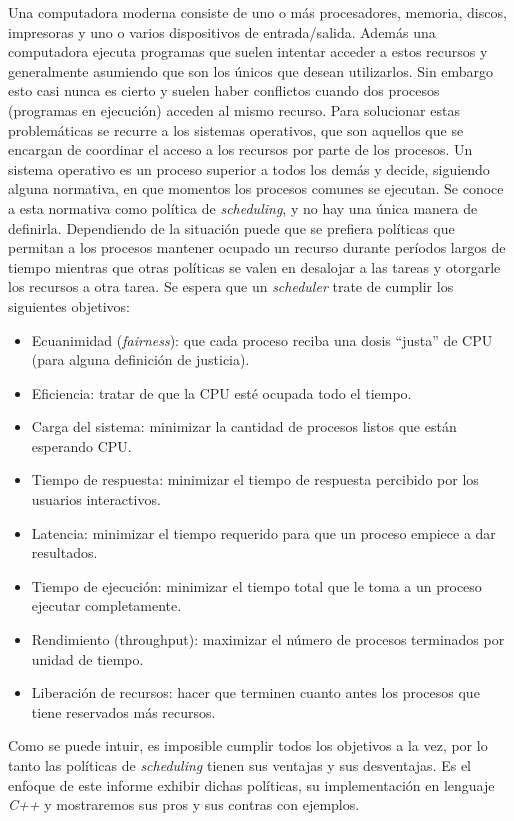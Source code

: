 Una computadora moderna consiste de uno o m\'as procesadores, memoria, discos, impresoras y uno o varios dispositivos de entrada/salida. Adem\'as una computadora ejecuta programas que suelen intentar acceder a estos recursos y generalmente asumiendo que son los \'unicos que desean utilizarlos. Sin embargo esto casi nunca es cierto y suelen haber conflictos cuando dos procesos (programas en ejecuci\'on) acceden al mismo recurso. Para solucionar estas problem\'aticas se recurre a los sistemas operativos, que son aquellos que se encargan de coordinar el acceso a los recursos por parte de los procesos. Un sistema operativo es un proceso superior a todos los dem\'as y decide, siguiendo alguna normativa, en que momentos los procesos comunes se ejecutan. Se conoce a esta normativa como pol\'itica de \emph{scheduling}, y no hay una \'unica manera de definirla. Dependiendo de la situaci\'on puede que se prefiera pol\'iticas que permitan a los procesos mantener ocupado un recurso durante per\'iodos largos de tiempo mientras que otras pol\'iticas se valen en desalojar a las tareas y otorgarle los recursos a otra tarea. Se espera que un \emph{scheduler} trate de cumplir los siguientes objetivos:

\begin{itemize}
	\item Ecuanimidad (\emph{fairness}): que cada proceso reciba una dosis “justa” de CPU (para alguna definici\'on de justicia).
	\item Eficiencia: tratar de que la CPU est\'e ocupada todo el tiempo.
	\item Carga del sistema: minimizar la cantidad de procesos listos que est\'an esperando CPU.
	\item Tiempo de respuesta: minimizar el tiempo de respuesta percibido por los usuarios interactivos.
	\item Latencia: minimizar el tiempo requerido para que un proceso empiece a dar resultados.
	\item Tiempo de ejecuci\'on: minimizar el tiempo total que le toma a un proceso ejecutar completamente.
	\item Rendimiento (throughput): maximizar el n\'umero de procesos terminados por unidad de tiempo.
	\item Liberaci\'on de recursos: hacer que terminen cuanto antes los procesos que tiene reservados m\'as recursos.
\end{itemize}

Como se puede intuir, es imposible cumplir todos los objetivos a la vez, por lo tanto las pol\'iticas de \emph{scheduling} tienen sus ventajas y sus desventajas. Es el enfoque de este informe exhibir dichas pol\'iticas, su implementaci\'on en lenguaje \emph{C++} y mostraremos sus pros y sus contras con ejemplos.

